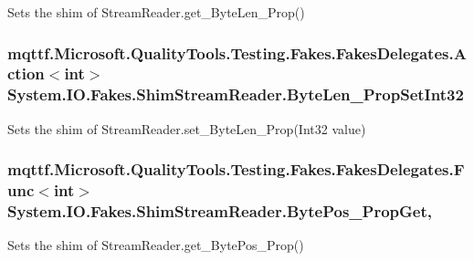 Sets the shim of Stream\-Reader.\-get\-\_\-\-Byte\-Len\-\_\-\-Prop()

\hypertarget{class_system_1_1_i_o_1_1_fakes_1_1_shim_stream_reader_a7ad8bf24cc99246cef65c34e477541d0}{
\subsubsection[{Byte\-Len\-\_\-\-Prop\-Set\-Int32}]{\setlength{\rightskip}{0pt plus 5cm}mqttf.\-Microsoft.\-Quality\-Tools.\-Testing.\-Fakes.\-Fakes\-Delegates.\-Action$<$int$>$ System.\-I\-O.\-Fakes.\-Shim\-Stream\-Reader.\-Byte\-Len\-\_\-\-Prop\-Set\-Int32\hspace{0.3cm}{\ttfamily [set]}}}\label{class_system_1_1_i_o_1_1_fakes_1_1_shim_stream_reader_a7ad8bf24cc99246cef65c34e477541d0}


Sets the shim of Stream\-Reader.\-set\-\_\-\-Byte\-Len\-\_\-\-Prop(\-Int32 value)

\hypertarget{class_system_1_1_i_o_1_1_fakes_1_1_shim_stream_reader_a0ea9d8b60fd615d78d46492aebc0eada}{
\subsubsection[{Byte\-Pos\-\_\-\-Prop\-Get}]{\setlength{\rightskip}{0pt plus 5cm}mqttf.\-Microsoft.\-Quality\-Tools.\-Testing.\-Fakes.\-Fakes\-Delegates.\-Func$<$int$>$ System.\-I\-O.\-Fakes.\-Shim\-Stream\-Reader.\-Byte\-Pos\-\_\-\-Prop\-Get\hspace{0.3cm}{\ttfamily [get]}, {\ttfamily [set]}}}\label{class_system_1_1_i_o_1_1_fakes_1_1_shim_stream_reader_a0ea9d8b60fd615d78d46492aebc0eada}


Sets the shim of Stream\-Reader.\-get\-\_\-\-Byte\-Pos\-\_\-\-Prop()

